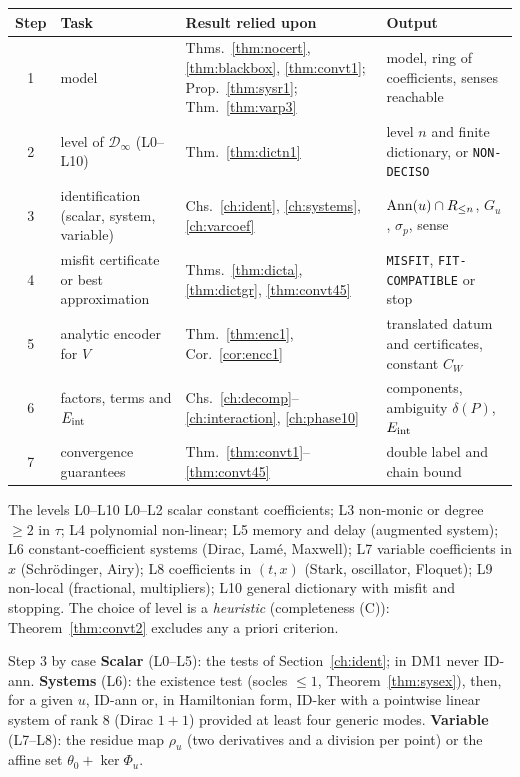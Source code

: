 \begin{center}\small
\begin{tabular}{@{}c L{2.6cm} L{5.4cm} L{5.0cm}@{}}
\toprule
Step & Task & Result relied upon & Output\\ & model & Thms.~\ref{thm:nocert}, \ref{thm:blackbox}, \ref{thm:convt1}; Prop.~\ref{thm:sysr1}; Thm.~\ref{thm:varp3} & model, ring of coefficients, senses reachable\\
2 & level of $\mathcal D_\infty$ (L0--L10) & Thm.~\ref{thm:dictn1} & level $n$ and finite dictionary, or \texttt{NON-DECISO}\\
3 & identification (scalar, system, variable) & Chs.~\ref{ch:ident}, \ref{ch:systems}, \ref{ch:varcoef} & $\operatorname{Ann}(u)\cap R_{\le n}$, $G_u$, $\sigma_p$, sense\\
4 & misfit certificate or best approximation & Thms.~\ref{thm:dicta}, \ref{thm:dictgr}, \ref{thm:convt45} & \texttt{MISFIT}, \texttt{FIT-COMPATIBLE} or stop\\
5 & analytic encoder for $V$ & Thm.~\ref{thm:enc1}, Cor.~\ref{cor:encc1} & translated datum and certificates, constant $C_W$\\
6 & factors, terms and $E_{\rm int}$ & Chs.~\ref{ch:decomp}--\ref{ch:interaction}, \ref{ch:phase10} & components, ambiguity $\delta(P)$, $E_{\rm int}$\\
7 & convergence guarantees & Thm.~\ref{thm:convt1}--\ref{thm:convt45} & double label and chain bound\\\bottomrule
\end{tabular}
\end{center}

\begin{aside}{The levels L0--L10}
L0--L2 scalar constant coefficients; L3 non-monic or degree $\ge2$ in $\tau$; L4 polynomial non-linear; L5 memory and delay (augmented system); L6 constant-coefficient systems (Dirac, Lam\'e, Maxwell); L7 variable coefficients in $x$ (Schr\"odinger, Airy); L8 coefficients in $(t,x)$ (Stark, oscillator, Floquet); L9 non-local (fractional, multipliers); L10 general dictionary with misfit and stopping. The choice of level is a \emph{heuristic} (completeness (C)): Theorem~\ref{thm:convt2} excludes any a priori criterion.
\end{aside}

\begin{aside}{Step 3 by case}
\textbf{Scalar} (L0--L5): the tests of Section~\ref{ch:ident}; in DM1 never ID-ann. \textbf{Systems} (L6): the existence test (socles $\le1$, Theorem~\ref{thm:sysex}), then, for a given $u$, ID-ann or, in Hamiltonian form, ID-ker with a pointwise linear system of rank $8$ (Dirac $1+1$) provided at least four generic modes. \textbf{Variable} (L7--L8): the residue map $\rho_u$ (two derivatives and a division per point) or the affine set $\theta_0+\ker\Phi_u$.
\end{aside}

